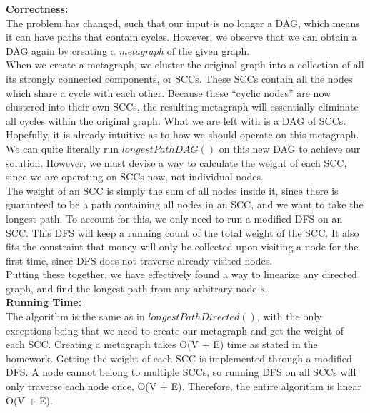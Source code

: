 \documentclass{exam}
\begin{document}
\begin{questions}
\begin{parts}
{\bf Correctness:}\\
The problem has changed, such that our input is no longer a DAG, which means it can have paths that contain cycles. However, we observe that we can obtain a DAG again by creating a {\em metagraph} of the given graph.\\

When we create a metagraph, we cluster the original graph into a collection of all its strongly connected components, or SCCs. These SCCs contain all the nodes which share a cycle with each other. Because these ``cyclic nodes'' are now clustered into their own SCCs, the resulting metagraph will essentially eliminate all cycles within the original graph. What we are left with is a DAG of SCCs.\\

Hopefully, it is already intuitive as to how we should operate on this metagraph. We can quite literally run $longestPathDAG()$ on this new DAG to achieve our solution. However, we must devise a way to calculate the weight of each SCC, since we are operating on SCCs now, not individual nodes.\\

The weight of an SCC is simply the sum of all nodes inside it, since there is guaranteed to be a path containing all nodes in an SCC, and we want to take the longest path. To account for this, we only need to run a modified DFS on an SCC. This DFS will keep a running count of the total weight of the SCC. It also fits the constraint that money will only be collected upon visiting a node for the first time, since DFS does not traverse already visited nodes.\\

Putting these together, we have effectively found a way to linearize any directed graph, and find the longest path from any arbitrary node $s$.\\

{\bf Running Time:}\\
The algorithm is the same as in $longestPathDirected()$, with the only exceptions being that we need to create our metagraph and get the weight of each SCC. Creating a metagraph takes O(V + E) time as stated in the homework. Getting the weight of each SCC is implemented through a modified DFS. A node cannot belong to multiple SCCs, so running DFS on all SCCs will only traverse each node once, O(V + E). Therefore, the entire algorithm is linear O(V + E).\\

\end{parts}


\end{questions}
\end{document}
